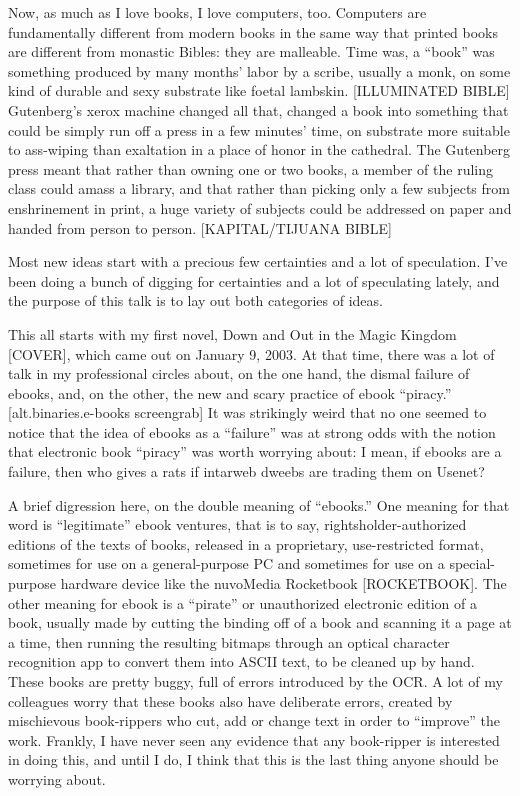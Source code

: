 Now, as much as I love books, I love computers, too. Computers are
fundamentally different from modern books in the same way that
printed books are different from monastic Bibles: they are
malleable. Time was, a ``book'' was something produced by many
months' labor by a scribe, usually a monk, on some kind of durable
and sexy substrate like foetal lambskin. [ILLUMINATED BIBLE]
Gutenberg's xerox machine changed all that, changed a book into
something that could be simply run off a press in a few minutes'
time, on substrate more suitable to ass-wiping than exaltation in a
place of honor in the cathedral. The Gutenberg press meant that
rather than owning one or two books, a member of the ruling class
could amass a library, and that rather than picking only a few
subjects from enshrinement in print, a huge variety of subjects
could be addressed on paper and handed from person to person.
[KAPITAL/TIJUANA BIBLE]

Most new ideas start with a precious few certainties and a lot of
speculation. I've been doing a bunch of digging for certainties and
a lot of speculating lately, and the purpose of this talk is to lay
out both categories of ideas.

This all starts with my first novel, Down and Out in the Magic
Kingdom [COVER], which came out on January 9, 2003. At that time,
there was a lot of talk in my professional circles about, on the
one hand, the dismal failure of ebooks, and, on the other, the new
and scary practice of ebook ``piracy.'' [alt.binaries.e-books
screengrab] It was strikingly weird that no one seemed to notice
that the idea of ebooks as a ``failure'' was at strong odds with the
notion that electronic book ``piracy'' was worth worrying about: I
mean, if ebooks are a failure, then who gives a rats if intarweb
dweebs are trading them on Usenet?

A brief digression here, on the double meaning of ``ebooks.'' One
meaning for that word is ``legitimate'' ebook ventures, that is to
say, rightsholder-authorized editions of the texts of books,
released in a proprietary, use-restricted format, sometimes for use
on a general-purpose PC and sometimes for use on a special-purpose
hardware device like the nuvoMedia Rocketbook [ROCKETBOOK]. The
other meaning for ebook is a ``pirate'' or unauthorized electronic
edition of a book, usually made by cutting the binding off of a
book and scanning it a page at a time, then running the resulting
bitmaps through an optical character recognition app to convert
them into ASCII text, to be cleaned up by hand. These books are
pretty buggy, full of errors introduced by the OCR. A lot of my
colleagues worry that these books also have deliberate errors,
created by mischievous book-rippers who cut, add or change text in
order to ``improve'' the work. Frankly, I have never seen any
evidence that any book-ripper is interested in doing this, and
until I do, I think that this is the last thing anyone should be
worrying about.

